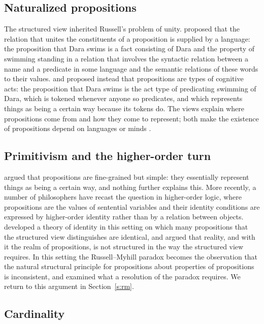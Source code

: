 \documentclass{situationist-preprint}
\begin{document}
\subsection{Naturalized propositions}

The structured view inherited Russell's problem of unity. \citet{King2007} proposed that the relation that unites the constituents of a proposition is supplied by a language: the proposition that Dara swims is a fact consisting of Dara and the property of swimming standing in a relation that involves the syntactic relation between a name and a predicate in some language and the semantic relations of these words to their values. \citet{Soames2010} and \citet{Hanks2015} proposed instead that propositions are types of cognitive acts: the proposition that Dara swims is the act type of predicating swimming of Dara, which is tokened whenever anyone so predicates, and which represents things as being a certain way because its tokens do. The views explain where propositions come from and how they come to represent; both make the existence of propositions depend on languages or minds \citep{KingSoamesSpeaks2014}.

\subsection{Primitivism and the higher-order turn}

\citet{Merricks2015} argued that propositions are fine-grained but simple: they essentially represent things as being a certain way, and nothing further explains this. More recently, a number of philosophers have recast the question in higher-order logic, where propositions are the values of sentential variables and their identity conditions are expressed by higher-order identity rather than by a relation between objects. \citet{Dorr2016} developed a theory of identity in this setting on which many propositions that the structured view distinguishes are identical, and \citet{Goodman2017} argued that reality, and with it the realm of propositions, is not structured in the way the structured view requires. In this setting the Russell--Myhill paradox becomes the observation that the natural structural principle for propositions about properties of propositions is inconsistent, and \citet{Uzquiano2015} examined what a resolution of the paradox requires. We return to this argument in Section~\ref{s:rm}.

\subsection{Cardinality}
\end{document}
